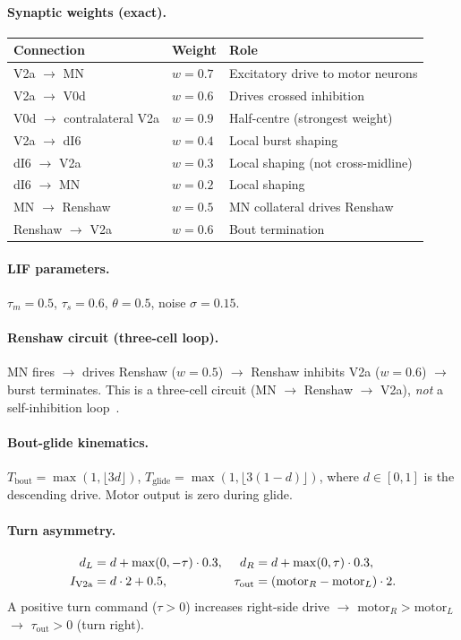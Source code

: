\documentclass[11pt,a4paper]{article}
\begin{document}
\paragraph{Synaptic weights (exact).}
\begin{center}
\begin{tabular}{lll}
\toprule
Connection & Weight & Role \\
\midrule
V2a $\to$ MN            & $w = 0.7$ & Excitatory drive to motor neurons \\
V2a $\to$ V0d           & $w = 0.6$ & Drives crossed inhibition \\
V0d $\to$ contralateral V2a & $w = 0.9$ & Half-centre (strongest weight) \\
V2a $\to$ dI6           & $w = 0.4$ & Local burst shaping \\
dI6 $\to$ V2a           & $w = 0.3$ & Local shaping (not cross-midline) \\
dI6 $\to$ MN            & $w = 0.2$ & Local shaping \\
MN $\to$ Renshaw        & $w = 0.5$ & MN collateral drives Renshaw \\
Renshaw $\to$ V2a       & $w = 0.6$ & Bout termination \\
\bottomrule
\end{tabular}
\end{center}

\paragraph{LIF parameters.}
$\tau_m = 0.5$, $\tau_s = 0.6$, $\theta = 0.5$, noise $\sigma = 0.15$.

\paragraph{Renshaw circuit (three-cell loop).}
MN fires $\to$ drives Renshaw ($w = 0.5$) $\to$ Renshaw inhibits V2a
($w = 0.6$) $\to$ burst terminates.
This is a three-cell circuit (MN $\to$ Renshaw $\to$ V2a), \emph{not} a
self-inhibition loop~\cite{bhatt2009}.

\paragraph{Bout-glide kinematics.}
$T_\text{bout} = \max(1,\lfloor 3 d\rfloor)$,
$T_\text{glide} = \max(1,\lfloor 3(1-d)\rfloor)$,
where $d\in[0,1]$ is the descending drive.
Motor output is zero during glide.

\paragraph{Turn asymmetry.}
\begin{align}
  d_L &= d + \max(0, -\tau)\cdot 0.3, &
  d_R &= d + \max(0, \tau)\cdot 0.3, \notag\\
  I_\text{V2a} &= d\cdot 2 + 0.5, &
  \tau_\text{out} &= (\text{motor}_R - \text{motor}_L)\cdot 2. \notag
\end{align}
A positive turn command ($\tau > 0$) increases right-side drive $\to$
$\text{motor}_R > \text{motor}_L$ $\to$ $\tau_\text{out} > 0$ (turn right).
\end{document}
